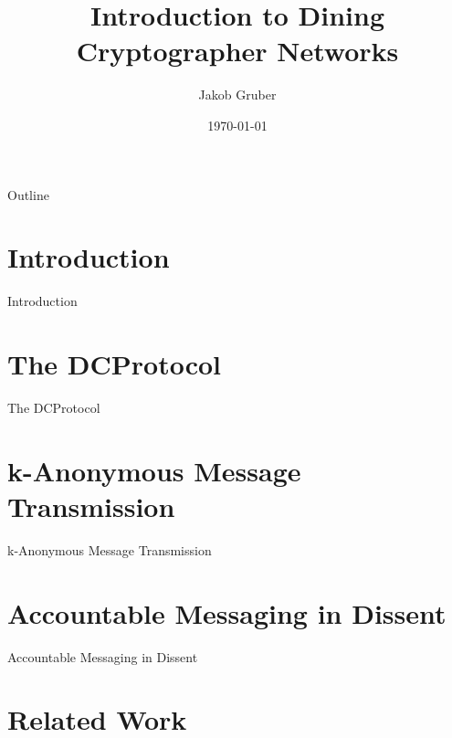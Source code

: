 \documentclass[]{beamer} %
\title{Introduction to Dining Cryptographer Networks}
\author{Jakob Gruber}
\date{\today}
\begin{document}
\maketitle

\begin{frame}{Outline}
	\begin{minipage}[t][10em][t]{\linewidth}
		\tableofcontents
	\end{minipage}
\end{frame}

\section{Introduction}

\begin{frame}{Introduction}
\end{frame}

\section{The \acl{DCProtocol}}

\begin{frame}{The \acl{DCProtocol}}
\end{frame}

\section{k-Anonymous Message Transmission}

\begin{frame}{k-Anonymous Message Transmission}
\end{frame}

\section{Accountable Messaging in Dissent}

\begin{frame}{Accountable Messaging in Dissent}
\end{frame}

\section{Related Work}
\end{document}
